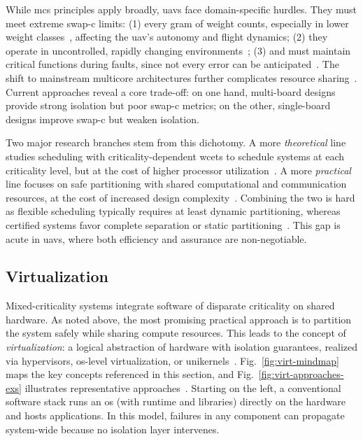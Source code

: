 While \gls{mcs} principles apply broadly, \glspl{uav} face domain-specific
hurdles. They must meet extreme \gls{swap-c} limits: (1) every gram of weight
counts, especially in lower weight classes~\cite{alladi2022UAVBlockain}, affecting the \gls{uav}'s autonomy
and flight dynamics; (2) they operate in uncontrolled,
rapidly changing environments~\cite{faical_adaptive_2017}; (3) and must maintain critical functions during faults, since not every error can be
anticipated~\cite{mohsan2022towards}.
The
shift to mainstream multicore architectures further complicates resource
sharing~\cite{burns2022mixed}. Current approaches reveal a core trade-off: on
one hand, multi-board designs provide strong isolation but poor \gls{swap-c}
metrics; on the other, single-board designs improve \gls{swap-c} but weaken isolation.

Two major research branches stem from this dichotomy. A more \emph{theoretical}
line studies scheduling with criticality-dependent \glspl{wcet} to schedule
systems at each criticality level, but at the cost of higher processor utilization~\cite{lee_estimating_2023}. A more \emph{practical}
line focuses on safe partitioning with shared computational and communication
resources, at the cost of increased design complexity~\cite{cinque2022virtualizing}. Combining the two is
hard as flexible scheduling typically requires at least dynamic partitioning,
whereas certified systems favor complete separation or static
partitioning~\cite{burns2022mixed}. This gap is acute in \glspl{uav}, where both
efficiency and assurance are non-negotiable.

\subsection{Virtualization}%
\label{sec:virtualization}
Mixed-criticality systems integrate software of disparate criticality on shared
hardware. As noted above, the most promising practical approach is to partition
the system safely while sharing compute resources. This leads to the concept of
\emph{virtualization}: a logical abstraction of hardware with isolation
guarantees, realized via hypervisors, \gls{os}-level virtualization, or
unikernels~\cite{cinque2022virtualizing}.
%
Fig.~\ref{fig:virt-mindmap} maps the key concepts referenced in this section,
and Fig.~\ref{fig:virt-approaches-exs} illustrates representative
approaches~\cite{cinque2022virtualizing}. Starting on the left, a conventional
software stack runs an \gls{os} (with runtime and libraries) directly on the
hardware and hosts applications. In this model, failures in any component can
propagate system-wide because no isolation layer intervenes.

